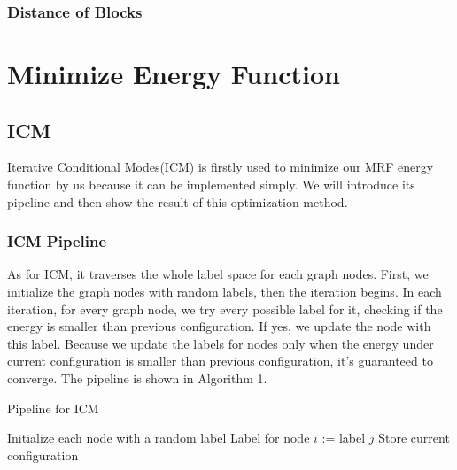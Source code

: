 \documentclass{article} %
\begin{document}
		\subsubsection{Distance of Blocks}
\section{Minimize Energy Function}
	\subsection{ICM}
	Iterative Conditional Modes(ICM)\cite{besag1986} is firstly used to minimize our MRF energy function by us because it can be implemented simply. We will introduce its pipeline and then show the result of this optimization method.
		\subsubsection{ICM Pipeline}
			As for ICM, it traverses the whole label space for each graph nodes. First, we initialize the graph nodes with random labels, then the iteration begins. In each iteration, for every graph node, we try every possible label for it, checking if the energy is smaller than previous configuration. If yes, we update the node with this label. Because we update the labels for nodes only when the energy under current configuration is smaller than previous configuration, it's guaranteed to converge. The pipeline is shown in Algorithm 1.
			\begin{algorithm}
			\caption{Pipeline for ICM}
			\begin{algorithmic}
			\State Initialize each node with a random label
							\State Label for node $i$ := label $j$ 
						\EndIf
					\EndFor
				\EndFor
				\State Store current configuration
			\EndWhile
			\end{algorithmic}
			\end{algorithm}
\end{document}
